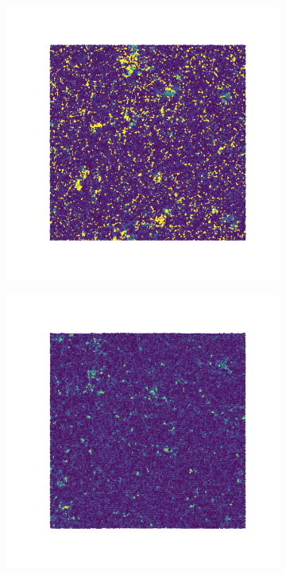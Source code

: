 \documentclass[a4paper]{article}
\begin{document}
\begin{figure}[ht]
\begin{subfigure}[ht]{.33\textwidth}
	\end{subfigure}\hfil
	\begin{subfigure}[ht]{.33\textwidth}
		\includegraphics[width=1\columnwidth]{718_-1.png}
	\end{subfigure}\hfil
	\begin{subfigure}[ht]{.33\textwidth}
		\includegraphics[width=1\columnwidth]{720_-1.png}

\end{subfigure}
\end{figure}
\end{document}
